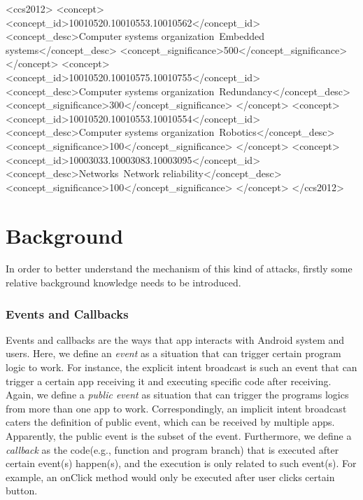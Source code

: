 \documentclass{sig-alternate-05-2015}
\begin{document}
%
%
\begin{CCSXML}
<ccs2012>
 <concept>
  <concept_id>10010520.10010553.10010562</concept_id>
  <concept_desc>Computer systems organization~Embedded systems</concept_desc>
  <concept_significance>500</concept_significance>
 </concept>
 <concept>
  <concept_id>10010520.10010575.10010755</concept_id>
  <concept_desc>Computer systems organization~Redundancy</concept_desc>
  <concept_significance>300</concept_significance>
 </concept>
 <concept>
  <concept_id>10010520.10010553.10010554</concept_id>
  <concept_desc>Computer systems organization~Robotics</concept_desc>
  <concept_significance>100</concept_significance>
 </concept>
 <concept>
  <concept_id>10003033.10003083.10003095</concept_id>
  <concept_desc>Networks~Network reliability</concept_desc>
  <concept_significance>100</concept_significance>
 </concept>
</ccs2012>  
\end{CCSXML}



%
%

%
%
\printccsdesc





\section{Background}
In order to better understand the mechanism of this kind of attacks, firstly some relative background knowledge needs to be introduced.

\subsubsection{Events and Callbacks}
Events and callbacks are the ways that app interacts with Android system and users. Here, we define an \textit{event} as a situation that can trigger certain program logic to work. For instance, the explicit intent broadcast is such an event that can trigger a certain app receiving it and executing specific code after receiving.
Again, we define a \textit{public event} as situation that can trigger the programs logics from more than one app to work. Correspondingly, an implicit intent broadcast caters the definition of public event, which can be received by multiple apps. Apparently, the public event is the subset of the event.
Furthermore, we define a \textit{callback} as the code(e.g., function and program branch) that is executed after certain event(s) happen(s), and the execution is only related to such event(s). For example, an onClick method would only be executed after user clicks certain button. 
\end{document}
